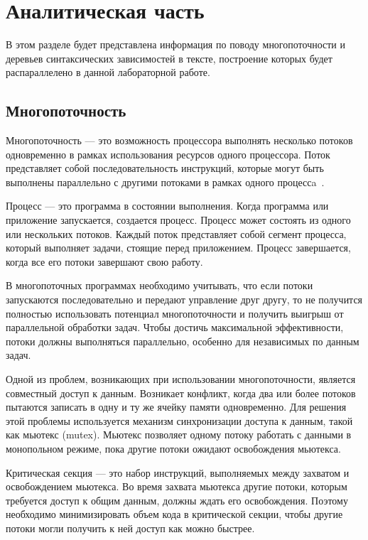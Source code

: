 \chapter{Аналитическая часть}
В этом разделе будет представлена информация по поводу многопоточности и деревьев синтаксических зависимостей в тексте, построение которых будет распараллелено в данной лабораторной работе.

\section{Многопоточность}

Многопоточность --- это возможность процессора выполнять несколько потоков одновременно в рамках использования ресурсов одного процессора. Поток представляет собой последовательность инструкций, которые могут быть выполнены параллельно с другими потоками в рамках одного процессa~\cite{threads}.

Процесс --- это программа в состоянии выполнения. Когда программа или приложение запускается, создается процесс. Процесс может состоять из одного или нескольких потоков. Каждый поток представляет собой сегмент процесса, который выполняет задачи, стоящие перед приложением. Процесс завершается, когда все его потоки завершают свою работу.

В многопоточных программах необходимо учитывать, что если потоки запускаются последовательно и передают управление друг другу, то не получится полностью использовать потенциал многопоточности и получить выигрыш от параллельной обработки задач. Чтобы достичь максимальной эффективности, потоки должны выполняться параллельно, особенно для независимых по данным задач.

Одной из проблем, возникающих при использовании многопоточности, является совместный доступ к данным. Возникает конфликт, когда два или более потоков пытаются записать в одну и ту же ячейку памяти одновременно. Для решения этой проблемы используется механизм синхронизации доступа к данным, такой как мьютекс (mutex). Мьютекс позволяет одному потоку работать с данными в монопольном режиме, пока другие потоки ожидают освобождения мьютекса.

Критическая секция --- это набор инструкций, выполняемых между захватом и освобождением мьютекса. Во время захвата мьютекса другие потоки, которым требуется доступ к общим данным, должны ждать его освобождения. Поэтому необходимо минимизировать объем кода в критической секции, чтобы другие потоки могли получить к ней доступ как можно быстрее.

